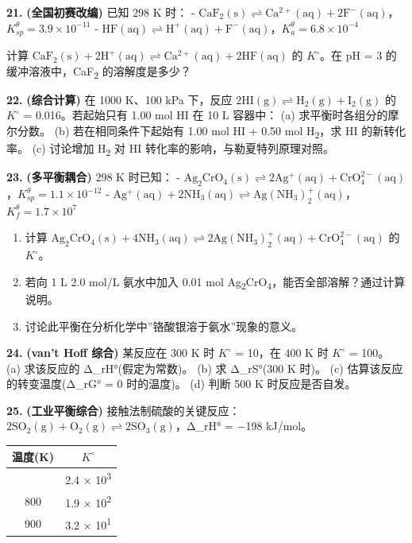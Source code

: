 \textbf{21.} \textbf{(全国初赛改编)} 已知 298 K 时：
- \(\mathrm{CaF_2(s) \rightleftharpoons Ca^{2+}(aq) + 2F^-(aq)}\)，\(K_{sp}^\theta = 3.9 \times 10^{-11}\)
- \(\mathrm{HF(aq) \rightleftharpoons H^+(aq) + F^-(aq)}\)，\(K_a^\theta = 6.8 \times 10^{-4}\)

计算 \(\mathrm{CaF_2(s) + 2H^+(aq) \rightleftharpoons Ca^{2+}(aq) + 2HF(aq)}\) 的 \(K^{\circ}\)。在 pH = 3 的缓冲溶液中，CaF\textsubscript{2} 的溶解度是多少？

\textbf{22.} \textbf{(综合计算)} 在 1000 K、100 kPa 下，反应 \(\mathrm{2HI(g) \rightleftharpoons H_2(g) + I_2(g)}\) 的 \(K^{\circ}\) = 0.016。若起始只有 1.00 mol HI 在 10 L 容器中：
(a) 求平衡时各组分的摩尔分数。
(b) 若在相同条件下起始有 1.00 mol HI + 0.50 mol H\textsubscript{2}，求 HI 的新转化率。
(c) 讨论增加 H\textsubscript{2} 对 HI 转化率的影响，与勒夏特列原理对照。

\textbf{23.} \textbf{(多平衡耦合)} 298 K 时已知：
- \(\mathrm{Ag_2CrO_4(s) \rightleftharpoons 2Ag^+(aq) + CrO_4^{2-}(aq)}\)，\(K_{sp}^\theta = 1.1 \times 10^{-12}\)
- \(\mathrm{Ag^+(aq) + 2NH_3(aq) \rightleftharpoons Ag(NH_3)_2^+(aq)}\)，\(K_f^\theta = 1.7 \times 10^7\)

\begin{enumerate}
\def\labelenumi{(\alph{enumi})}
\tightlist
\item
  计算 \(\mathrm{Ag_2CrO_4(s) + 4NH_3(aq) \rightleftharpoons 2Ag(NH_3)_2^+(aq) + CrO_4^{2-}(aq)}\) 的 \(K^{\circ}\)。
\item
  若向 1 L 2.0 mol/L 氨水中加入 0.01 mol Ag\textsubscript{2}CrO\textsubscript{4}，能否全部溶解？通过计算说明。
\item
  讨论此平衡在分析化学中''铬酸银溶于氨水''现象的意义。
\end{enumerate}

\textbf{24.} \textbf{(van't Hoff 综合)} 某反应在 300 K 时 \(K^{\circ}\) = 10，在 400 K 时 \(K^{\circ}\) = 100。
(a) 求该反应的 Δ\_rH°(假定为常数)。
(b) 求 Δ\_rS°(300 K 时)。
(c) 估算该反应的转变温度(Δ\_rG° = 0 时的温度)。
(d) 判断 500 K 时反应是否自发。

\textbf{25.} \textbf{(工业平衡综合)} 接触法制硫酸的关键反应：\(\mathrm{2SO_2(g) + O_2(g) \rightleftharpoons 2SO_3(g)}\)，Δ\_rH° = −198 kJ/mol。

{\def\LTcaptype{none} %
\begin{longtable}[]{@{}cc@{}}
\toprule\noalign{}
温度(K) & \(K^{\circ}\) \\
\midrule\noalign{}
\endhead
\bottomrule\noalign{}
\endlastfoot
700 & 2.4 × 10\textsuperscript{3} \\
800 & 1.9 × 10\textsuperscript{2} \\
900 & 3.2 × 10\textsuperscript{1} \\
\end{longtable}
}

